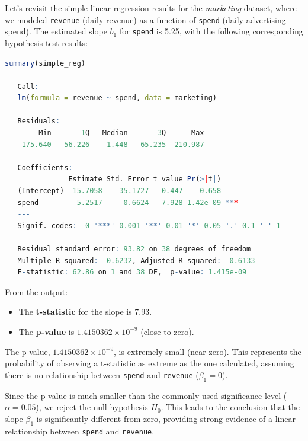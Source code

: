 \documentclass[
]{book}
\newcommand{\passthrough}[1]{#1}
\providecommand{\tightlist}{%
  \setlength{\itemsep}{0pt}\setlength{\parskip}{0pt}}
\theoremstyle{definition}
\theoremstyle{definition}
\theoremstyle{definition}
\theoremstyle{definition}
\theoremstyle{remark}
\begin{document}
Let's revisit the simple linear regression results for the \emph{marketing} dataset, where we modeled \passthrough{\lstinline!revenue!} (daily revenue) as a function of \passthrough{\lstinline!spend!} (daily advertising spend). The estimated slope \(b_1\) for \passthrough{\lstinline!spend!} is 5.25, with the following corresponding hypothesis test results:

\begin{lstlisting}[language=R]
summary(simple_reg)
   
   Call:
   lm(formula = revenue ~ spend, data = marketing)
   
   Residuals:
        Min       1Q   Median       3Q      Max 
   -175.640  -56.226    1.448   65.235  210.987 
   
   Coefficients:
               Estimate Std. Error t value Pr(>|t|)    
   (Intercept)  15.7058    35.1727   0.447    0.658    
   spend         5.2517     0.6624   7.928 1.42e-09 ***
   ---
   Signif. codes:  0 '***' 0.001 '**' 0.01 '*' 0.05 '.' 0.1 ' ' 1
   
   Residual standard error: 93.82 on 38 degrees of freedom
   Multiple R-squared:  0.6232, Adjusted R-squared:  0.6133 
   F-statistic: 62.86 on 1 and 38 DF,  p-value: 1.415e-09
\end{lstlisting}

From the output:

\begin{itemize}
\tightlist
\item
  The \textbf{t-statistic} for the slope is 7.93.\\
\item
  The \textbf{p-value} is \ensuremath{1.4150362\times 10^{-9}} (close to zero).
\end{itemize}

The p-value, \ensuremath{1.4150362\times 10^{-9}}, is extremely small (near zero). This represents the probability of observing a t-statistic as extreme as the one calculated, assuming there is no relationship between \passthrough{\lstinline!spend!} and \passthrough{\lstinline!revenue!} (\(\beta_1 = 0\)).

Since the p-value is much smaller than the commonly used significance level (\(\alpha = 0.05\)), we reject the null hypothesis \(H_0\). This leads to the conclusion that the slope \(\beta_1\) is significantly different from zero, providing strong evidence of a linear relationship between \passthrough{\lstinline!spend!} and \passthrough{\lstinline!revenue!}.
\end{document}
